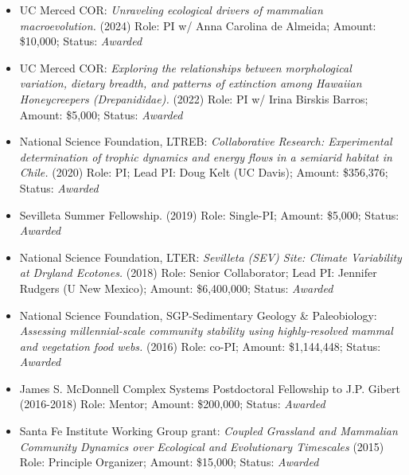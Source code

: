 \documentclass[margin,line,12pt]{res}
\begin{document}
\begin{resume}
\begin{itemize}
\item UC Merced COR: \emph{Unraveling ecological drivers of mammalian macroevolution.} (2024) Role: PI w/ Anna Carolina de Almeida; Amount: \$10,000; Status: \emph{Awarded}

\item UC Merced COR: \emph{Exploring the relationships between morphological variation, dietary breadth, and patterns of extinction among Hawaiian Honeycreepers (Drepanididae).} (2022) Role: PI w/ Irina Birskis Barros; Amount: \$5,000; Status: \emph{Awarded}
  
\item National Science Foundation, LTREB: \emph{Collaborative Research: Experimental determination of trophic dynamics and energy flows in a semiarid habitat in Chile.} (2020) Role: PI; Lead PI: Doug Kelt (UC Davis); Amount: \$356,376; Status: \emph{Awarded}

\item Sevilleta Summer Fellowship. (2019) Role: Single-PI; Amount: \$5,000; Status: \emph{Awarded}

\item National Science Foundation, LTER: \emph{Sevilleta (SEV) Site: Climate Variability at Dryland Ecotones.} (2018) Role: Senior Collaborator; Lead PI: Jennifer Rudgers (U New Mexico); Amount: \$6,400,000; Status: \emph{Awarded}

\item National Science Foundation, SGP-Sedimentary Geology \& Paleobiology: \emph{Assessing millennial-scale community stability using highly-resolved mammal and vegetation food webs.} (2016) Role: co-PI; Amount: \$1,144,448; Status: \emph{Awarded}

\item James S. McDonnell Complex Systems Postdoctoral Fellowship to J.P. Gibert (2016-2018) Role: Mentor; Amount: \$200,000; Status: \emph{Awarded}

\item Santa Fe Institute Working Group grant: \emph{Coupled Grassland and Mammalian Community Dynamics over Ecological and Evolutionary Timescales} (2015) Role: Principle Organizer; Amount: \$15,000; Status: \emph{Awarded}


\end{itemize}
\end{resume}
\end{document}
